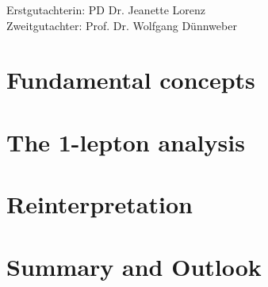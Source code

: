 \documentclass[a4paper,11pt,numbered,pdftex,dvipsnames]{Classes/PhDThesisPSnPDF}
\begin{document}
\frontmatter

\maketitle

\cleardoublepage

\makegermantitle
\newpage
Erstgutachterin: PD\@\xspace Dr.\@\xspace Jeanette Lorenz \\
Zweitgutachter: Prof.\@\xspace Dr.\@\xspace Wolfgang D\"unnweber






\tableofcontents

%




\mainmatter

\listoftodos[Notes]


\part{Fundamental concepts}\label{part:fundamentals}




\part{The 1-lepton analysis}\label{part:simplified_model_analysis}






\part{Reinterpretation}\label{part:reinterpretation}




\part{Summary and Outlook}\label{part:summary}

\end{document}
